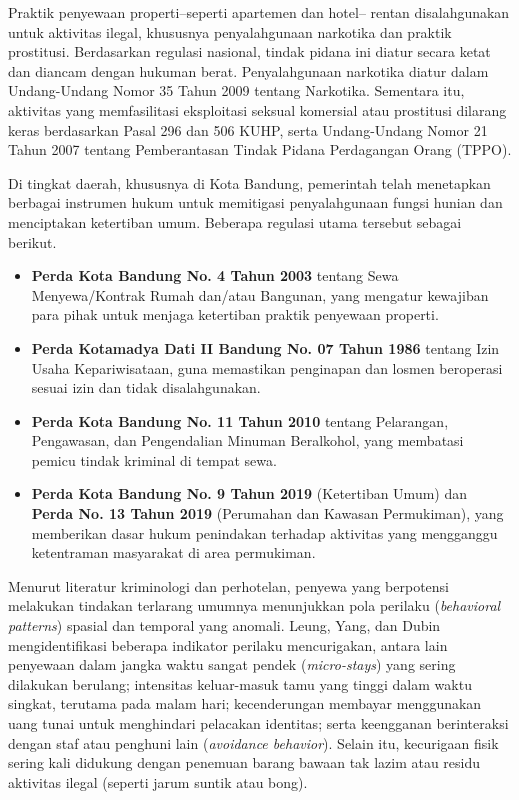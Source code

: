 Praktik penyewaan properti--seperti apartemen dan hotel-- rentan disalahgunakan untuk aktivitas ilegal, khususnya penyalahgunaan narkotika dan praktik prostitusi. Berdasarkan regulasi nasional, tindak pidana ini diatur secara ketat dan diancam dengan hukuman berat. Penyalahgunaan narkotika diatur dalam Undang-Undang Nomor 35 Tahun 2009 tentang Narkotika. Sementara itu, aktivitas yang memfasilitasi eksploitasi seksual komersial atau prostitusi dilarang keras berdasarkan Pasal 296 dan 506 KUHP, serta Undang-Undang Nomor 21 Tahun 2007 tentang Pemberantasan Tindak Pidana Perdagangan Orang (TPPO).

Di tingkat daerah, khususnya di Kota Bandung, pemerintah telah menetapkan berbagai instrumen hukum untuk memitigasi penyalahgunaan fungsi hunian dan menciptakan ketertiban umum. Beberapa regulasi utama tersebut sebagai berikut.
\begin{itemize}
    \item \textbf{Perda Kota Bandung No. 4 Tahun 2003} tentang Sewa Menyewa/Kontrak Rumah dan/atau Bangunan, yang mengatur kewajiban para pihak untuk menjaga ketertiban praktik penyewaan properti.
    \item \textbf{Perda Kotamadya Dati II Bandung No. 07 Tahun 1986} tentang Izin Usaha Kepariwisataan, guna memastikan penginapan dan losmen beroperasi sesuai izin dan tidak disalahgunakan.
    \item \textbf{Perda Kota Bandung No. 11 Tahun 2010} tentang Pelarangan, Pengawasan, dan Pengendalian Minuman Beralkohol, yang membatasi pemicu tindak kriminal di tempat sewa.
    \item \textbf{Perda Kota Bandung No. 9 Tahun 2019} (Ketertiban Umum) dan \textbf{Perda No. 13 Tahun 2019} (Perumahan dan Kawasan Permukiman), yang memberikan dasar hukum penindakan terhadap aktivitas yang mengganggu ketentraman masyarakat di area permukiman.
\end{itemize}

Menurut literatur kriminologi dan perhotelan, penyewa yang berpotensi melakukan tindakan terlarang umumnya menunjukkan pola perilaku (\textit{behavioral patterns}) spasial dan temporal yang anomali. Leung, Yang, dan Dubin \cite{rephann2007polaperilaku} mengidentifikasi beberapa indikator perilaku mencurigakan, antara lain penyewaan dalam jangka waktu sangat pendek (\textit{micro-stays}) yang sering dilakukan berulang; intensitas keluar-masuk tamu yang tinggi dalam waktu singkat, terutama pada malam hari; kecenderungan membayar menggunakan uang tunai untuk menghindari pelacakan identitas; serta keengganan berinteraksi dengan staf atau penghuni lain (\textit{avoidance behavior}). Selain itu, kecurigaan fisik sering kali didukung dengan penemuan barang bawaan tak lazim atau residu aktivitas ilegal (seperti jarum suntik atau bong).


